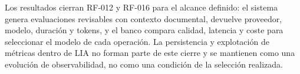 Los resultados cierran RF-012 y RF-016 para el alcance definido: el sistema
genera evaluaciones revisables con contexto documental, devuelve proveedor,
modelo, duración y tokens, y el banco compara calidad, latencia y coste para
seleccionar el modelo de cada operación. La persistencia y explotación de
métricas dentro de LIA no forman parte de este cierre y se mantienen como una
evolución de observabilidad, no como una condición de la selección realizada.
